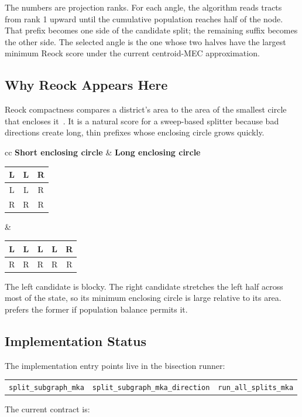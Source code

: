 The numbers are projection ranks. For each angle, the algorithm reads tracts
from rank 1 upward until the cumulative population reaches half of the node.
That prefix becomes one side of the candidate split; the remaining suffix
becomes the other side. The selected angle is the one whose two halves have the
largest minimum Reock score under the current centroid-MEC approximation.

\subsection{Why Reock Appears Here}

Reock compactness compares a district's area to the area of the smallest circle
that encloses it~\citep{reock1961}. It is a natural score for a sweep-based
splitter because bad directions create long, thin prefixes whose enclosing
circle grows quickly.

\begin{center}
\begin{tabular}{cc}
\textbf{Short enclosing circle} & \textbf{Long enclosing circle} \\
\begin{tabular}{|c|c|c|}
\hline
L & L & R \\
\hline
L & L & R \\
\hline
R & R & R \\
\hline
\end{tabular}
&
\begin{tabular}{|c|c|c|c|c|}
\hline
L & L & L & L & R \\
\hline
R & R & R & R & R \\
\hline
\end{tabular}
\end{tabular}
\end{center}

The left candidate is blocky. The right candidate stretches the left half
across most of the state, so its minimum enclosing circle is large relative to
its area. \mka{} prefers the former if population balance permits it.

\subsection{Implementation Status}

The implementation entry points live in the bisection runner:
\begin{center}
\small
\begin{tabular}{lll}
\texttt{split\_subgraph\_mka} &
\texttt{split\_subgraph\_mka\_direction} &
\texttt{run\_all\_splits\_mka}
\end{tabular}
\end{center}
The current contract is:

